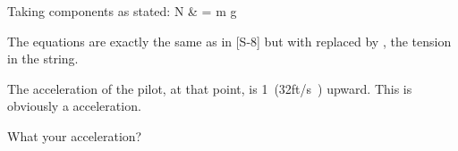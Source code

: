 {
{Taking components as stated:
           {N \cos\theta & = m g}
}


{The equations are exactly the same as in [S-8] but with  replaced by
 , the tension in the string.
}


 {
}

{The acceleration of the pilot, at that point, is 1\, (32\unit{ft/s})
 upward.
 This is obviously a  acceleration.
}

{
 What  your acceleration?
}

}%
